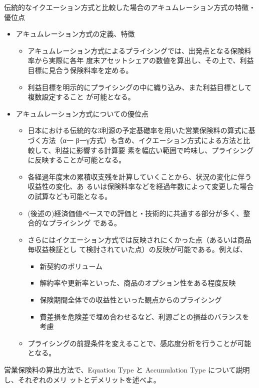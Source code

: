 \documentclass[report,gutter=10mm,fore-edge=10mm,uplatex,dvipdfmx]{jlreq}
\begin{document}
伝統的なイクエーション方式と比較した場合のアキュムレーション方式の特徴・優位点
\begin{itemize}
 \item アキュムレーション方式の定義、特徴
\begin{itemize}
 \item  アキュムレーション方式によるプライシングでは、出発点となる保険料率から実際に各年
度末アセットシェアの数値を算出し、その上で、利益目標に見合う保険料率を定める。
 \item  利益目標を明示的にプライシングの中に織り込み、また利益目標として複数設定すること
が可能となる。
\end{itemize}
 \item アキュムレーション方式についての優位点
\begin{itemize}
 \item  日本における伝統的な3利源の予定基礎率を用いた営業保険料の算式に基づく方法（α一
β一γ方式）も含め、イクエーション方式による方法と比較して、利益に影響する計算要
素を幅広い範囲で吟味し、プライシングに反映することが可能となる。
 \item 各経過年度末の累積収支残を計算していくことから、状況の変化に伴う収益性の変化、あ
るいは保険料率などを経過年数によって変更した場合の試算なども可能となる。
 \item (後述の)経済価値べ一スでの評価と・技術的に共通する部分が多く、整合的なプライシング
である。
 \item さらにはイクエーション方式では反映されにくかった点（あるいは商品毎収益検証とし
て検討されていた点）の反映が可能である。例えば、
\begin{itemize}
 \item 新契約のボリューム
 \item 解約率や更新率といった、商品のオプション性をある程度反映
 \item 保険期間全体での収益性といった観点からのプライシング
 \item 費差損を危険差で埋め合わせるなど、利源ごとの損益のバランスを考慮
\end{itemize}
 \item プライシングの前提条件を変えることで、感応度分析を行うことが可能となる。
\end{itemize}
\end{itemize}
 

営業保険料の算出方法で、Equation Type と Accumulation Type について説明し、それぞれのメリ
ットとデメリットを述べよ。
\end{document}
